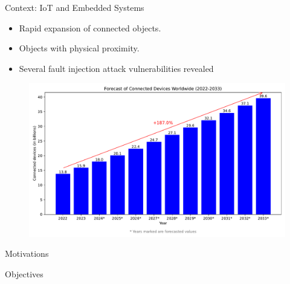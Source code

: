 \begin{frame}{Context: IoT and Embedded Systems}
    \begin{minipage}[c]{0.4\textwidth}
        \begin{itemize}
            [square]
            \justifying
            \item Rapid expansion of connected objects.
            \item Objects with physical proximity.
            \item Several fault injection attack vulnerabilities revealed
        \end{itemize}
	\end{minipage}\hfill%
	\begin{minipage}[c]{0.6\textwidth}
		\begin{figure}
            \centering
            \includegraphics[width=.9\textwidth]{src/1_introduction/img/iot_forecasts.pdf}
            \label{fig:nbr_iot}
        \end{figure}
	\end{minipage}
\end{frame}

\begin{frame}{Motivations}
    
\end{frame}
\begin{frame}{Objectives}
    
\end{frame}
